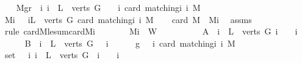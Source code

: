 \begin{isabellebody}
\ \ \isamarkupfalse%
\ {\isacharquery}Mgr{}\ {\isacharequal}\ {\isachardoublequoteopen}{\isasymSum}i{\isacharbar}\ i\ {\isasymin}\ L\ {\isacharbackquote}\ verts\ G\ {\isasymand}\ {}\ {\isacharless}\ i{\isachardot}\ card\ {\isacharparenleft}matching{\isacharunderscore}i\ i\ M{\isacharparenright}{\isachardoublequoteclose}\isanewline
\ \ \isamarkupfalse%
\ {\isacharquery}Mi\ {\isacharequal}\ {\isachardoublequoteopen}{\isasymSum}\ i{\isasymin}L\ {\isacharbackquote}\ verts\ G{\isachardot}\ card\ {\isacharparenleft}matching{\isacharunderscore}i\ i\ M{\isacharparenright}{\isachardoublequoteclose}\isanewline
\ \ \isamarkupfalse%
\ {\isachardoublequoteopen}card\ M\ {\isasymle}\ {\isacharquery}Mi{\isachardoublequoteclose}\ \isamarkupfalse%
\ assms\ \isamarkupfalse%
\ {\isacharparenleft}rule\ card{\isacharunderscore}M{\isacharunderscore}le{\isacharunderscore}sum{\isacharunderscore}card{\isacharunderscore}Mi{\isacharparenright}\ \isanewline
\ \ \isamarkupfalse%
\isanewline
\ \ \isamarkupfalse%
\ {\isachardoublequoteopen}{\isacharquery}Mi\ {\isasymle}\ {\isacharquery}W{\isachardoublequoteclose}\isanewline
\ \ \isamarkupfalse%
\ {\isacharminus}\isanewline
\ \ \ \ \isamarkupfalse%
\ {\isacharquery}A\ {\isacharequal}\ {\isachardoublequoteopen}{\isacharbraceleft}i\ {\isasymin}\ L\ {\isacharbackquote}\ verts\ G{\isachardot}\ i\ {\isacharequal}\ {}\ {\isasymor}\ i\ {\isacharequal}\ {}{\isacharbraceright}{\isachardoublequoteclose}\isanewline
\ \ \ \ \isamarkupfalse%
\ {\isacharquery}B\ {\isacharequal}\ {\isachardoublequoteopen}{\isacharbraceleft}i\ {\isasymin}\ L\ {\isacharbackquote}\ verts\ G{\isachardot}\ {}\ {\isacharless}\ i{\isacharbraceright}{\isachardoublequoteclose}\isanewline
\ \ \ \ \isamarkupfalse%
\ {\isacharquery}g\ {\isacharequal}\ {\isachardoublequoteopen}{\isasymlambda}\ i{\isachardot}\ card\ {\isacharparenleft}matching{\isacharunderscore}i\ i\ M{\isacharparenright}{\isachardoublequoteclose}\isanewline
\ \ \ \ \isamarkupfalse%
\ {\isacharquery}set{}{}\ {\isacharequal}\ {\isachardoublequoteopen}{\isacharbraceleft}\ i{\isachardot}\ i\ {\isacharcolon}\ L\ {\isacharbackquote}\ verts\ G\ {\isacharampersand}\ {\isacharparenleft}i\ {\isacharequal}\ {}\ {\isacharbar}\ i\ {\isacharequal}\ {}{\isacharparenright}{\isacharbraceright}{\isachardoublequoteclose}\isanewline

\end{isabellebody}
